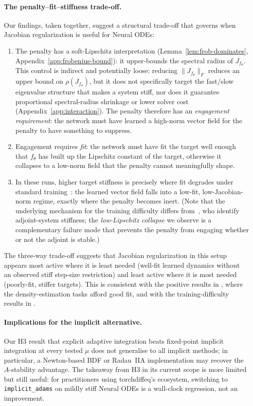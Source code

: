 \documentclass[11pt]{article}
\theoremstyle{plain}
\theoremstyle{definition}
\newcommand{\fjac}{J_{f_\theta}}
\begin{document}
\paragraph{The penalty--fit--stiffness trade-off.}
Our findings, taken together, suggest a structural trade-off that governs
when Jacobian regularization is useful for Neural ODEs:
\begin{enumerate}[leftmargin=2em]
\item The penalty has a soft-Lipschitz interpretation
  (Lemma~\ref{lem:frob-dominates}, Appendix~\ref{app:frobenius-bound}): it
  upper-bounds the spectral radius of $\fjac$. This control is indirect and
  potentially loose: reducing $\|\fjac\|_F$ reduces an upper bound on
  $\rho(\fjac)$, but it does not specifically target the fast/slow eigenvalue
  structure that makes a system stiff, nor does it guarantee proportional
  spectral-radius shrinkage or lower solver cost (Appendix~\ref{app:interaction}).
  The penalty therefore has an \emph{engagement requirement}: the
  network must have learned a high-norm vector field for the penalty to have
  something to suppress.
\item Engagement requires \emph{fit}: the network must have fit the target
  well enough that $f_\theta$ has built up the Lipschitz constant of the
  target, otherwise it collapses to a low-norm field that the penalty cannot
  meaningfully shape.
\item In these runs, higher target stiffness is precisely where fit degrades
  under standard training~\citep{kim2021stiff}: the learned vector field falls
  into a low-fit, low-Jacobian-norm regime, exactly where the penalty becomes
  inert. (Note that the underlying mechanism for the training difficulty
  differs from~\citet{kim2021stiff}, who identify adjoint-system stiffness;
  the \emph{low-Lipschitz collapse} we observe is a complementary failure mode
  that prevents the penalty from engaging whether or not the adjoint is
  stable.)
\end{enumerate}
The three-way trade-off suggests that Jacobian regularization in this setup
appears most active where it is least needed (well-fit learned dynamics without
an observed stiff step-size restriction) and least active where it is most
needed (poorly-fit, stiffer targets). This is consistent
with the positive results in \citet{finlay2020train}, where the
density-estimation tasks afford good fit, and with the training-difficulty
results in \citet{kim2021stiff}.

\paragraph{Implications for the implicit alternative.}
Our H3 result that explicit adaptive integration beats fixed-point implicit
integration at every tested $\mu$ does not generalise to all implicit
methods; in particular, a Newton-based BDF or Radau~IIA implementation may
recover the $A$-stability advantage. The takeaway from H3 in its current
scope is more limited but still useful: for practitioners using
torchdiffeq's ecosystem, switching to \texttt{implicit\_adams} on mildly
stiff Neural ODEs is a wall-clock regression, not an improvement.
\end{document}
